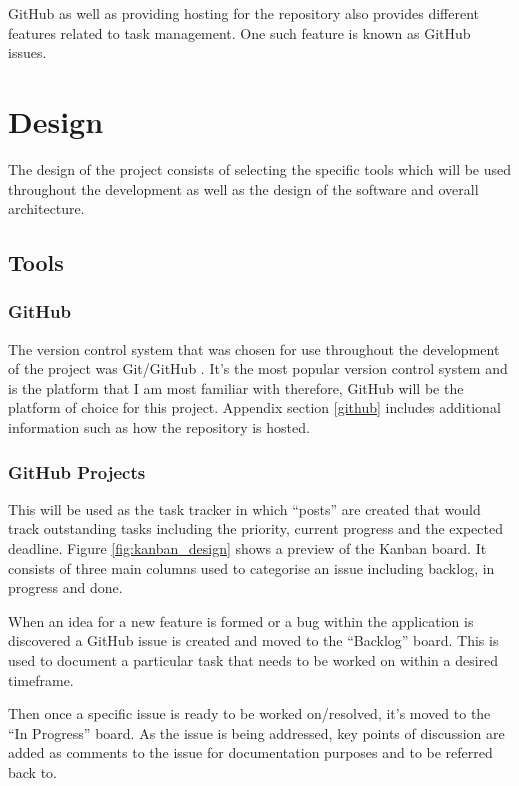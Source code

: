 \documentclass[11pt]{article}
\begin{document}
GitHub as well as providing hosting for the repository also provides different
features related to task management. One such feature is known as GitHub issues.

\clearpage
\section{Design} \label{design} The design of the project consists of selecting
the specific tools which will be used throughout the development as well as the
design of the software and overall architecture.

\subsection{Tools}
\subsubsection{GitHub} \label{project_management}
The version control system that was chosen for use throughout the development of
the project was Git/GitHub \cite{gitvcs}. It's the most popular version control
system and is the platform that I am most familiar with therefore, GitHub will
be the platform of choice for this project. Appendix section \ref{github}
includes additional information such as how the repository is hosted.

\subsubsection{GitHub Projects}
This will be used as the task tracker in which ``posts'' are created that would
track outstanding tasks including the priority, current progress and the
expected deadline. Figure \ref{fig:kanban_design} shows a preview of the Kanban
board. It consists of three main columns used to categorise an issue including
backlog, in progress and done. 

When an idea for a new feature is formed or a bug within the application is
discovered a GitHub issue is created and moved to the ``Backlog'' board. This is
used to document a particular task that needs to be worked on within a desired
timeframe.

Then once a specific issue is ready to be worked on/resolved, it's moved to the
``In Progress'' board. As the issue is being addressed, key points of discussion
are added as comments to the issue for documentation purposes and to be referred
back to.
\end{document}
